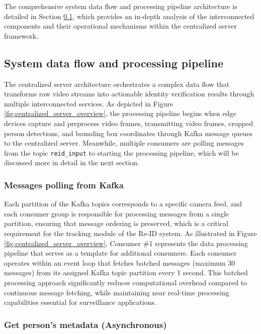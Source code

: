 The comprehensive system data flow and processing pipeline architecture is detailed in Section \ref{sec:system_data_flow}, which provides an in-depth analysis of the interconnected components and their operational mechanisms within the centralized server framework.

\subsection{System data flow and processing pipeline}
\label{sec:system_data_flow}

The centralized server architecture orchestrates a complex data flow that transforms raw video streams into actionable identity verification results through multiple interconnected services. As depicted in Figure \ref{fig:centralized_server_overview}, the processing pipeline begins when edge devices capture and preprocess video frames, transmitting video frames, cropped person detections, and bounding box coordinates through Kafka message queues to the centralized server. Meanwhile, multiple consumers are polling messages from the topic \texttt{reid\_input} to starting the processing pipeline, which will be discussed more in detail in the next section.

\subsubsection{Messages polling from Kafka}
\label{sec:kafka_messages_polling}

Each partition of the Kafka topics corresponds to a specific camera feed, and each consumer group is responsible for processing messages from a single partition, ensuring that message ordering is preserved, which is a critical requirement for the tracking module of the Re-ID system. As illustrated in Figure \ref{fig:centralized_server_overview}, Consumer \#1 represents the data processing pipeline that serves as a template for additional consumers. Each consumer operates within an event loop that fetches batched messages (maximum 30 messages) from its assigned Kafka topic partition every 1 second. This batched processing approach significantly reduces computational overhead compared to continuous message fetching, while maintaining near real-time processing capabilities essential for surveillance applications.

\subsubsection{Get person's metadata (Asynchronous)}


